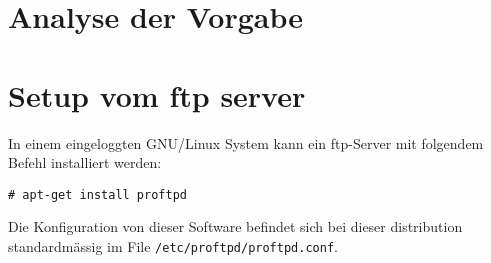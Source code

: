\documentclass[11pt,twoside,a4paper]{article}
\title{\titleText}
\author{\authorText}
\date{\dateText}
\begin{document}
	\maketitle
	\tableofcontents
	\section{Analyse der Vorgabe}
	

	\section{Setup vom ftp server}
        In einem eingeloggten GNU/Linux System kann ein ftp-Server mit folgendem Befehl installiert werden:

        \texttt{# apt-get install proftpd}

        Die Konfiguration von dieser Software befindet sich bei dieser distribution standardmässig im File \texttt{/etc/proftpd/proftpd.conf}.
	
\end{document}
